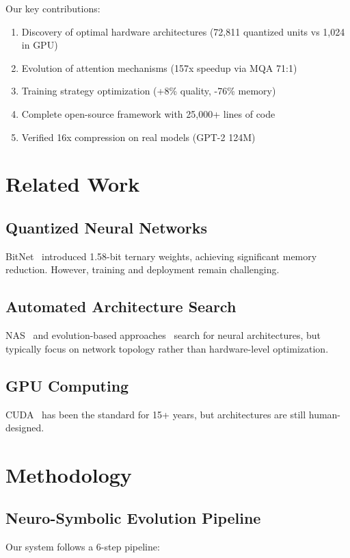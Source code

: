 \documentclass[10pt,conference]{IEEEtran}
\begin{document}
Our key contributions:
\begin{enumerate}
    \item Discovery of optimal hardware architectures (72,811 quantized units vs 1,024 in GPU)
    \item Evolution of attention mechanisms (157x speedup via MQA 71:1)
    \item Training strategy optimization (+8\% quality, -76\% memory)
    \item Complete open-source framework with 25,000+ lines of code
    \item Verified 16x compression on real models (GPT-2 124M)
\end{enumerate}

\section{Related Work}

\subsection{Quantized Neural Networks}
BitNet~\cite{bitnet} introduced 1.58-bit ternary weights, achieving significant memory reduction. However, training and deployment remain challenging.

\subsection{Automated Architecture Search}
NAS~\cite{nas} and evolution-based approaches~\cite{evolution} search for neural architectures, but typically focus on network topology rather than hardware-level optimization.

\subsection{GPU Computing}
CUDA~\cite{cuda} has been the standard for 15+ years, but architectures are still human-designed.

\section{Methodology}

\subsection{Neuro-Symbolic Evolution Pipeline}

Our system follows a 6-step pipeline:
\end{document}

